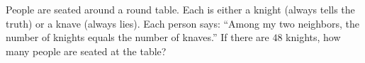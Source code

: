 People are seated around a round table. Each is either a knight (always tells the truth) or a knave (always lies). Each person says: ``Among my two neighbors, the number of knights equals the number of knaves.'' If there are $48$ knights, how many people are seated at the table?

